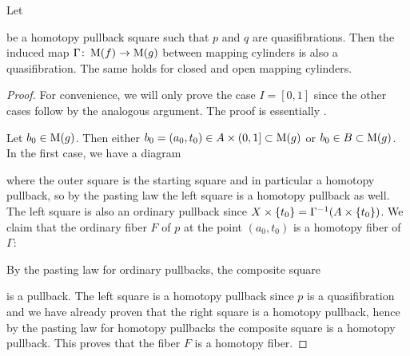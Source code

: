 \begin{lemma}\label{lem:mapOfCylIsQuasiFib}
    Let 
    \begin{center}
    \end{center}
    be a homotopy pullback square such that $p$ and $q$ are quasifibrations.
    Then the induced map $\Gamma\colon\operatorname{M}(f)\to\operatorname{M}(g)$ between mapping cylinders is also a quasifibration.
    The same holds for closed and open mapping cylinders.
    \begin{proof}
        For convenience, we will only prove the case $I=[0,1]$ since the other cases follow by the analogous argument.
        The proof is essentially \cite[Lemma 5.10.6]{cubical_htpy_theory}.

        Let $b_0\in\operatorname{M}(g)$. 
        Then either $b_0=(a_0,t_0)\in A\times(0,1]\subset\operatorname{M}(g)$ or $b_0\in B\subset\operatorname{M}(g)$.
        In the first case, we have a diagram
        \begin{center}
        \end{center}
        where the outer square is the starting square and in particular a homotopy pullback, so by the pasting law the left square is a homotopy pullback as well.
        The left square is also an ordinary pullback since $X\times\left\lbrace t_0\right\rbrace=\Gamma^{-1}(A\times\left\lbrace t_0\right\rbrace)$.
        We claim that the ordinary fiber $F$ of $p$ at the point $(a_0,t_0)$ is a homotopy fiber of $\Gamma$:
        
        By the pasting law for ordinary pullbacks, the composite square
        \begin{center}
        \end{center}
        is a pullback. 
        The left square is a homotopy pullback since $p$ is a quasifibration and we have already proven that the right square is a homotopy pullback, hence by the pasting law for homotopy pullbacks the composite square is a homotopy pullback. 
        This proves that the fiber $F$ is a homotopy fiber.


\end{proof}
\end{lemma}

